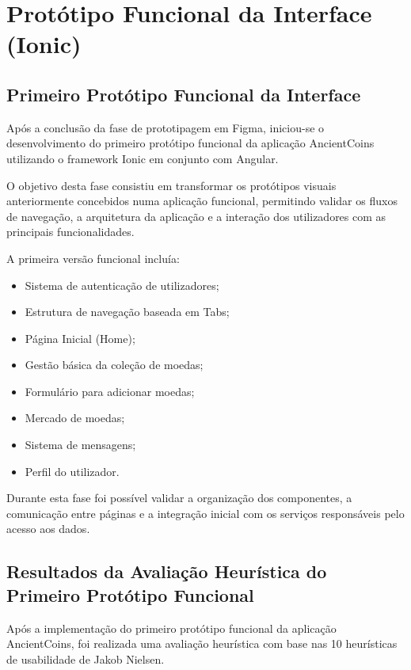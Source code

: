 \documentclass[12pt,a4paper]{article}
\begin{document}
\section{Protótipo Funcional da Interface (Ionic)}

\subsection{Primeiro Protótipo Funcional da Interface}

Após a conclusão da fase de prototipagem em Figma, iniciou-se o desenvolvimento do primeiro protótipo funcional da aplicação AncientCoins utilizando o framework Ionic em conjunto com Angular.

O objetivo desta fase consistiu em transformar os protótipos visuais anteriormente concebidos numa aplicação funcional, permitindo validar os fluxos de navegação, a arquitetura da aplicação e a interação dos utilizadores com as principais funcionalidades.

A primeira versão funcional incluía:

\begin{itemize}
\setlength{\itemsep}{0.15em}
\item Sistema de autenticação de utilizadores;
\item Estrutura de navegação baseada em Tabs;
\item Página Inicial (Home);
\item Gestão básica da coleção de moedas;
\item Formulário para adicionar moedas;
\item Mercado de moedas;
\item Sistema de mensagens;
\item Perfil do utilizador.
\end{itemize}

Durante esta fase foi possível validar a organização dos componentes, a comunicação entre páginas e a integração inicial com os serviços responsáveis pelo acesso aos dados.

\subsection{Resultados da Avaliação Heurística do Primeiro Protótipo Funcional}

Após a implementação do primeiro protótipo funcional da aplicação AncientCoins, foi realizada uma avaliação heurística com base nas 10 heurísticas de usabilidade de Jakob Nielsen.
\end{document}
